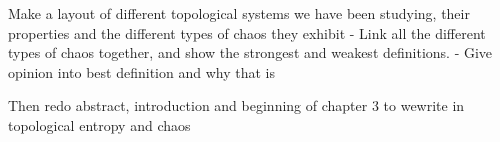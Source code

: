 Make a layout of different topological systems we have been studying, their properties and the different types of chaos they exhibit
- Link all the different types of chaos together, and show the strongest and weakest definitions.
- Give opinion into best definition and why that is


Then redo abstract, introduction and beginning of chapter 3 to wewrite in topological entropy and chaos